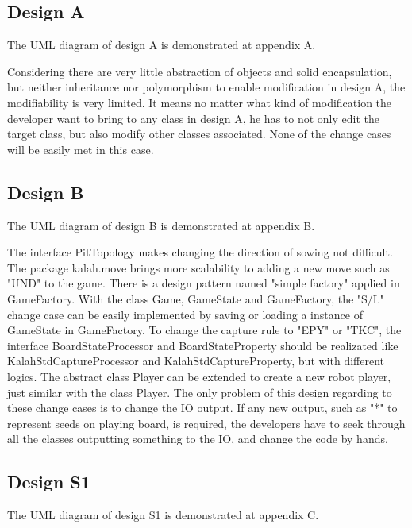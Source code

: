 \documentclass[conference]{IEEEtran}
\begin{document}
	\subsection{Design A}
	The UML diagram of design A is demonstrated at appendix A.
	
	Considering there are very little abstraction of objects and solid encapsulation, but neither inheritance nor polymorphism to enable modification in design A, the modifiability is very limited. It means no matter what kind of modification the developer want to bring to any class in design A, he has to not only edit the target class, but also modify other classes associated. None of the change cases will be easily met in this case.
	
	\subsection{Design B}
	The UML diagram of design B is demonstrated at appendix B.
	
	The interface PitTopology makes changing the direction of sowing not difficult. The package kalah.move brings more scalability to adding a new move  such as "UND" to the game. There is a design pattern named "simple factory" applied in GameFactory. With the class Game, GameState and GameFactory, the "S/L" change case can be easily implemented by saving or loading a instance of GameState in GameFactory. To change the capture rule to "EPY" or "TKC", the interface BoardStateProcessor and BoardStateProperty should be realizated like KalahStdCaptureProcessor and KalahStdCaptureProperty, but with different logics. The abstract class Player can be extended to create a new robot player, just similar with the class Player. The only problem of this design regarding to these change cases is to change the IO output. If any new output, such as "*" to represent seeds on playing board, is required, the developers have to seek through all the classes outputting something to the IO, and change the code by hands.
	
	\subsection{Design S1}
	The UML diagram of design S1 is demonstrated at appendix C.
	
\end{document}
